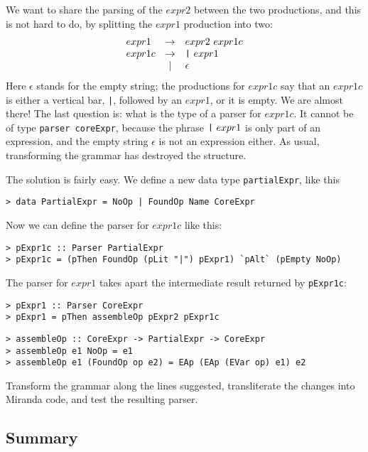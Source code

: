 We want to share the parsing of the $expr2$ between the two
productions, and this is not hard to do, by splitting the $expr1$
production into two:
\[
\begin{array}{lcl}
expr1 & \rightarrow & expr2 ~ expr1c \\
expr1c & \rightarrow & \mbox{\tt |}~ expr1 \\
        & | & \epsilon
\end{array}
\]
Here $\epsilon$ stands for the empty string; the productions for $expr1c$
say that an $expr1c$ is either a vertical bar, \mbox{\tt |}, followed by an $expr1$,
or it is empty.
We are almost there!  The last question is: what is the type of a parser for
$expr1c$.  It cannot be of type \mbox{\tt parser\ coreExpr}, because the
phrase $\mbox{\tt |}~expr1$ is only part of an expression, and the empty string
$\epsilon$ is not an expression either.  As usual, transforming the grammar
has destroyed the structure.

The solution is fairly easy.  We define a new data type \mbox{\tt partialExpr}, like this
\begin{verbatim}
> data PartialExpr = NoOp | FoundOp Name CoreExpr
\end{verbatim}
%
%
Now we can define the parser for $expr1c$ like this:
\begin{verbatim}
> pExpr1c :: Parser PartialExpr
> pExpr1c = (pThen FoundOp (pLit "|") pExpr1) `pAlt` (pEmpty NoOp)
\end{verbatim}
%
%
The parser for $expr1$ takes apart the intermediate result returned by
\mbox{\tt pExpr1c}:
\begin{verbatim}
> pExpr1 :: Parser CoreExpr
> pExpr1 = pThen assembleOp pExpr2 pExpr1c
\end{verbatim}
%
%
\begin{verbatim}
> assembleOp :: CoreExpr -> PartialExpr -> CoreExpr
> assembleOp e1 NoOp = e1
> assembleOp e1 (FoundOp op e2) = EAp (EAp (EVar op) e1) e2
\end{verbatim}
%
%
%
\begin{exercise}
Transform the grammar along the lines suggested,  transliterate the changes into
Miranda code, and test the resulting parser.
\end{exercise}

\subsection{Summary}

